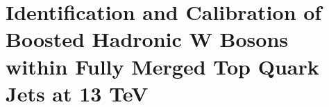 \chapter{Identification and Calibration of Boosted Hadronic W
Bosons within Fully Merged Top Quark Jets at 13 TeV}\label{chap:AN-17-177}
